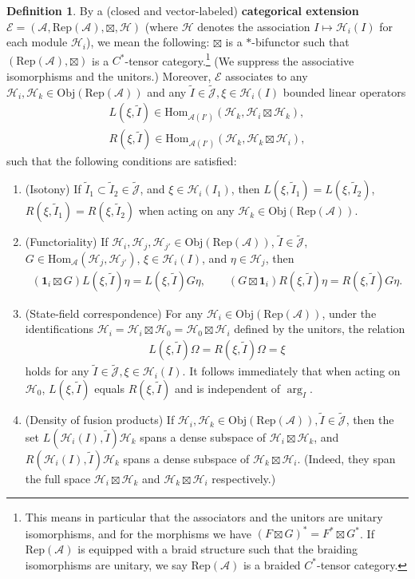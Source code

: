 \documentclass[11pt,b5paper,notitlepage]{article}
\theoremstyle{definition}
\newtheorem{df}{Definition}[section]
\theoremstyle{plain}
\newcommand{\fk}{\mathfrak}
\newcommand{\mc}{\mathcal}
\newcommand{\wtd}{\widetilde}
\newcommand{\id}{\mathbf{1}}
\newcommand{\Hom}{\mathrm{Hom}}
\newcommand{\Rep}{\mathrm{Rep}}
\newcommand{\scr}{\mathscr}
\newcommand{\Jtd}{\widetilde{\mathcal J}}
\newcommand{\RepA}{\mathrm{Rep}(\mathcal A)}
\newcommand{\Obj}{\mathrm{Obj}}
\numberwithin{equation}{section}
\begin{document}
\begin{df}\label{lb23}
By a (closed and vector-labeled) \textbf{categorical extension} $\scr E=(\mc A,\Rep(\mc A),\boxtimes,\mc H)$ (where $\mc H$ denotes the association $I\mapsto \mc H_i(I)$ for each module $\mc H_i$), we mean the following: $\boxtimes$ is a $*$-bifunctor such that $(\RepA,\boxtimes)$ is a  $C^*$-tensor category.\footnote{This means in particular that the associators and the unitors are unitary isomorphisms, and for the morphisms we have $(F\boxtimes G)^*=F^*\boxtimes G^*$. If $\Rep(\mc A)$ is equipped with a braid structure such that the braiding isomorphisms are unitary, we say $\Rep(\mc A)$ is a braided $C^*$-tensor category.} (We suppress the associative isomorphisms and the unitors.)  Moreover,  $\scr E$ associates to any  $\mc H_i,\mc H_k\in\Obj(\Rep(\mc A))$ and any $\wtd I\in\Jtd,\fk \xi\in\mc H_i(I)$ bounded linear operators
\begin{gather*}
	L(\xi,\wtd I)\in\Hom_{\mc A(I')}(\mc H_k,\mc H_i\boxtimes\mc H_k),\\
	R(\xi,\wtd I)\in\Hom_{\mc A(I')}(\mc H_k,\mc H_k\boxtimes\mc H_i),
\end{gather*}
such that the following conditions are satisfied:
\begin{enumerate}[label=(\alph*)]
\item (Isotony) If $\wtd I_1\subset\wtd I_2\in\Jtd$, and $\xi\in\mc H_i(I_1)$, then $L(\xi,\wtd I_1)=L(\xi,\wtd I_2)$, $R(\xi,\wtd I_1)=R(\xi,\wtd I_2)$ when acting on any  $\mc H_k\in\Obj(\Rep(\mc A))$.
\item (Functoriality) If $\mc H_i,\mc H_j,\mc H_{j'}\in\Obj(\RepA)$, $\wtd I\in\Jtd$, $G\in\Hom_{\mc A}(\mc H_j,\mc H_{j'})$,  $\xi\in\mc H_i(I)$, and $\eta\in\mc H_j$, then
\begin{align}
	(\id_i\boxtimes G)L(\xi,\wtd I)\eta=L(\xi,\wtd I)G\eta,\qquad (G\boxtimes \id_i)R(\xi,\wtd I)\eta=R(\xi,\wtd I)G\eta.
\end{align}
\item (State-field correspondence) For any $\mc H_i\in\Obj(\RepA)$, under the identifications $\mc H_i=\mc H_i\boxtimes\mc H_0=\mc H_0\boxtimes\mc H_i$ defined by the unitors, the relation
\begin{align}
	L(\xi,\wtd I)\Omega=R(\xi,\wtd I)\Omega=\xi\label{eq14}
\end{align}
holds for any $\wtd I\in\Jtd,\xi\in\mc H_i(I)$. It follows immediately that when acting on $\mc H_0$, $L(\xi,\wtd I)$ equals $R(\xi,\wtd I)$ and is independent of $\arg_I$.
\item (Density of fusion products) If $\mc H_i,\mc H_k\in\Obj(\RepA),\wtd I\in\Jtd$, then the set $L(\mc H_i(I),\wtd I)\mc H_k$ spans a dense subspace of $\mc H_i\boxtimes\mc H_k$, and $R(\mc H_i(I),\wtd I)\mc H_k$ spans a dense subspace of $\mc H_k\boxtimes\mc H_i$. (Indeed, they span the full space $\mc H_i\boxtimes\mc H_k$ and $\mc H_k\boxtimes\mc H_i$ respectively.)

\end{enumerate}
\end{df}
\end{document}
